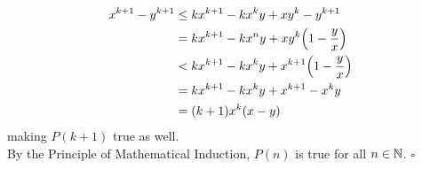 \documentclass[../MATH135.tex]{subfiles}
\begin{document}
\begin{enumerate}
							\begin{align*}
								x^{k + 1} - y^{k + 1} &\le kx^{k + 1} - kx^ky + xy^k - y^{k + 1} \\
									&= kx^{k + 1} - kx^ny + xy^k\qty(1 - \frac{y}{x}) \\
									&< kx^{k + 1} - kx^ky + x^{k + 1}\qty(1 - \frac{y}{x}) \\
									&= kx^{k + 1} - kx^ky + x^{k + 1} - x^ky\\
									&= (k + 1)x^k(x - y) \\
							\end{align*}
							making \(P(k + 1)\) true as well. \\
							By the Principle of Mathematical Induction, \(P(n)\) is true for all \(n \in \mathbb{N}\). \(\square\)
		\end{enumerate}
\end{document}
